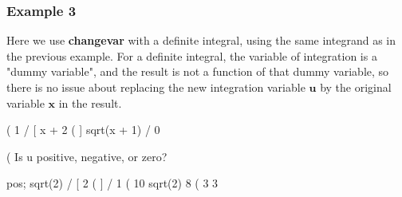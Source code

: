 \documentclass[12pt]{article}
\newcommand{\tcbr}{\textcolor{BrickRed}}
\begin{document}
\subsubsection*{Example 3}
Here we use \textbf{changevar} with a \tcbr{definite integral}, using
  the same integrand as in the previous example.
For a definite integral, the variable of integration is a "dummy variable", and
  the result is not a function of that dummy variable, so there is no issue
  about replacing the new integration variable $\mathbf{u}$ by the original variable $\mathbf{x}$
  in the result.
\begin{myVerbatim}
(%
                                1
                               /
                               [     x + 2
(%
                               ]  sqrt(x + 1)
                               /
                                0
\end{myVerbatim}
\newpage
\begin{myVerbatim}
(%
Is  u  positive, negative, or zero?

pos;
                             sqrt(2)
                            /
                            [            2
(%
                            ]
                            /
                             1
(%
                                10 sqrt(2)   8
(%
                                    3        3
\end{myVerbatim} 
\end{document}
